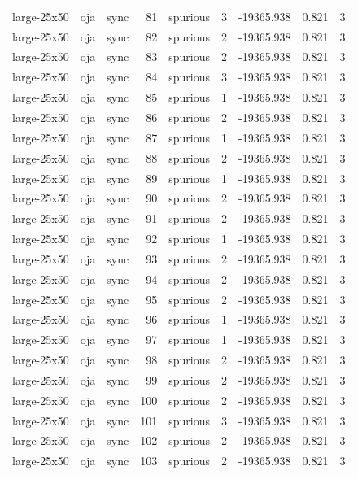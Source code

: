 \begin{tabular}{lllrlrrrr}
large-25x50 & oja & sync & 81 & spurious & 3 & -19365.938 & 0.821 & 3 \\
large-25x50 & oja & sync & 82 & spurious & 2 & -19365.938 & 0.821 & 3 \\
large-25x50 & oja & sync & 83 & spurious & 2 & -19365.938 & 0.821 & 3 \\
large-25x50 & oja & sync & 84 & spurious & 3 & -19365.938 & 0.821 & 3 \\
large-25x50 & oja & sync & 85 & spurious & 1 & -19365.938 & 0.821 & 3 \\
large-25x50 & oja & sync & 86 & spurious & 2 & -19365.938 & 0.821 & 3 \\
large-25x50 & oja & sync & 87 & spurious & 1 & -19365.938 & 0.821 & 3 \\
large-25x50 & oja & sync & 88 & spurious & 2 & -19365.938 & 0.821 & 3 \\
large-25x50 & oja & sync & 89 & spurious & 1 & -19365.938 & 0.821 & 3 \\
large-25x50 & oja & sync & 90 & spurious & 2 & -19365.938 & 0.821 & 3 \\
large-25x50 & oja & sync & 91 & spurious & 2 & -19365.938 & 0.821 & 3 \\
large-25x50 & oja & sync & 92 & spurious & 1 & -19365.938 & 0.821 & 3 \\
large-25x50 & oja & sync & 93 & spurious & 2 & -19365.938 & 0.821 & 3 \\
large-25x50 & oja & sync & 94 & spurious & 2 & -19365.938 & 0.821 & 3 \\
large-25x50 & oja & sync & 95 & spurious & 2 & -19365.938 & 0.821 & 3 \\
large-25x50 & oja & sync & 96 & spurious & 1 & -19365.938 & 0.821 & 3 \\
large-25x50 & oja & sync & 97 & spurious & 1 & -19365.938 & 0.821 & 3 \\
large-25x50 & oja & sync & 98 & spurious & 2 & -19365.938 & 0.821 & 3 \\
large-25x50 & oja & sync & 99 & spurious & 2 & -19365.938 & 0.821 & 3 \\
large-25x50 & oja & sync & 100 & spurious & 2 & -19365.938 & 0.821 & 3 \\
large-25x50 & oja & sync & 101 & spurious & 3 & -19365.938 & 0.821 & 3 \\
large-25x50 & oja & sync & 102 & spurious & 2 & -19365.938 & 0.821 & 3 \\
large-25x50 & oja & sync & 103 & spurious & 2 & -19365.938 & 0.821 & 3 \\

\end{tabular}
